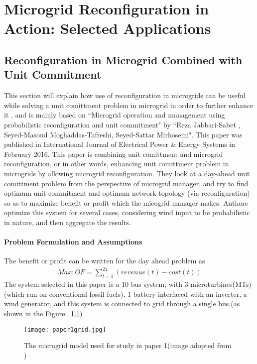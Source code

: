 \chapter{Microgrid Reconfiguration in Action: Selected Applications} \label{ch3}

\section{Reconfiguration in Microgrid Combined with Unit Commitment }\label{ch3sec1}
This section will explain how use of reconfiguration in microgrids can be useful while solving a unit comittment problem in microgrid in order to further enhance it , and is mainly based on ``Microgrid operation and management using probabilistic reconfiguration and unit commitment" by ``Reza Jabbari-Sabet , Seyed-Masoud Moghaddas-Tafreshi, Seyed-Sattar Mirhoseini"\citep{Jabbari-Sabet2016328}. This paper was published in International Journal of Electrical Power \&  Energy Systems in February 2016. This paper is combining unit comittment and microgrid reconfiguration, or in other words, enhancing unit comittment problem in microgrids by allowing microgrid reconfiguration. They look at a day-ahead unit comittment problem from the perspective of microgrid manager, and try to find optimum unit commitment and optimum network topology (via reconfiguration) so as to maximize benefit or profit which the micogrid manager makes. Authors optimize this system for several cases, considering wind input to be probabilistic in nature, and then aggregate the results.\\
\subsubsection{Problem Formulation and Assumptions}
The benefit or profit can be written for the day ahead problem as
\begin{eqnarray}
Max: OF = \sum\limits_{t=1}^{24}(revenue(t)-cost(t))
\end{eqnarray}
The system selected in this paper is a 10 bus system, with 3 microturbines(MTs) (which run on conventional fossil fuels), 1 battery interfaced with an inverter, a wind generator, and this system is connected to grid through a single bus.(as shown in the Figure ~\ref{fig:pap1grid})
\begin{figure}[tbp]
  \centering
    \texttt{[image: paper1grid.jpg]}%
    \caption[Paper 1 Microgrid System]{The microgrid model used for study in paper 1(image adopted from \cite{Jabbari-Sabet2016328})}
    \label{fig:pap1grid} 
\end{figure}

